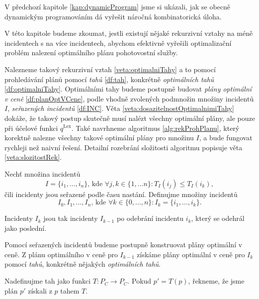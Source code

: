 V předchozí kapitole \ref{kap:dynamicProgram} jsme si ukázali, jak se obecně dynamickým programováním dá 
vyřešit náročná kombinatorická úloha.

V této kapitole budeme zkoumat, jestli existují nějaké rekurzivní vztahy 
 na méně incidentech s  na více incidentech, abychom efektivně vyřešili optimalizační problém nalezení optimálního plánu pohotovostní služby. 

Nalezneme takový rekurzivní vztah \ref{veta:optimalniTahy} a to pomocí prohledávání plánů pomocí \textit{tahů} \ref{df:tah}, konkrétně \textit{optimálních tahů} \ref{df:optimalniTahy}.
Optimálními tahy budeme postupně budovat \textit{plány optimální v ceně} \ref{df:planOptVCene},
podle vhodně zvolených podmnožin množiny incidentů $I$, \textit{seřazených incidentů} \ref{df:INC}.
Věta \ref{veta:dosazitelnostOptimalnimiTahy} dokáže, že takový postup skutečně musí nalézt všechny optimální plány, ale pouze při účelové funkci $q^{\text{Lex}}$.
Také navrhneme algoritmus \ref{alg:rekProhPlanu},
který korektně nalezne všechny takové optimální plány pro množinu $I$, a bude fungovat rychleji než naivní řešení.
Detailní rozebrání složitosti algoritmu popisuje věta \ref{veta:slozitostRek}.

\begin{definice}\label{df:INC}
  Nechť množina incidentů 
  \begin{equation*}
    I = \{ i_1, \dots , i_n \} \text{, kde } \forall j, k \in \{ 1, \dots n\} \colon T_I(i_j) \leq T_I(i_k),
  \end{equation*}
  čili incidenty jsou seřazené podle času nastání.
  Definujme množiny incidentů
  \begin{equation*}
    I_0, I_1, \dots, I_n \text{, kde } \forall k \in \{ 0, \dots, n \} \colon I_k = \{ i_1, \dots, i_k \}.
  \end{equation*}

  Incidenty $I_k$ jsou tak incidenty $I_{k-1}$ po odebrání incidentu $i_k$, který se odehrál jako poslední.
\end{definice}

Pomocí seřazených incidentů budeme postupně konstruovat plány optimální v ceně.
Z plánu optimálního v ceně pro $I_{k-1}$ získáme plány optimální v ceně pro $I_k$ pomocí \textit{tahů}, konkrétně nějakých \textit{optimálních tahů}.
\begin{definice}[Tah]\label{df:tah}
  Nadefinujme tah jako funkci $T \colon P_C \rightarrow P_C$.
  Pokud $p' = T(p)$, řekneme, že jsme plán $p'$ získali z $p$ tahem $T$.
\end{definice}

